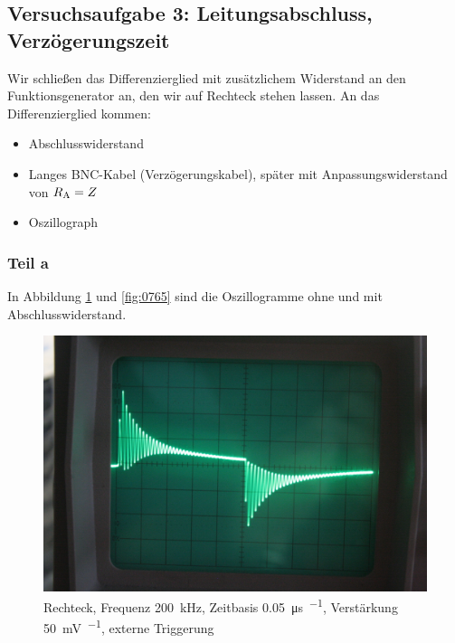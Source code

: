 \FloatBarrier
\subsection{Versuchsaufgabe 3: Leitungsabschluss, Verzögerungszeit}

Wir schließen das Differenzierglied mit zusätzlichem Widerstand an den
Funktionsgenerator an, den wir auf Rechteck stehen lassen. An das
Differenzierglied kommen:
%
\begin{itemize}
	\item
		Abschlusswiderstand
	\item
		Langes BNC-Kabel (Verzögerungskabel), später mit Anpassungswiderstand
		von $R_\text A = Z$
	\item
		Oszillograph
\end{itemize}

\FloatBarrier
\subsubsection{Teil a}

In Abbildung \ref{fig:0763} und \ref{fig:0765} sind die Oszillogramme ohne und
mit Abschlusswiderstand.

\begin{figure}
	\centering
	\begin{minipage}{.45\linewidth}
	\end{minipage}
	\hfill
	\begin{minipage}{.45\linewidth}
	\includegraphics[width=\linewidth]{Fotos/IMG_0763-1500.jpg}
	\end{minipage}
	\caption{%
		Rechteck, Frequenz \SI{200}{\kilo\hertz},
		Zeitbasis \SI{.05}{\micro\second\per\division},
		Verstärkung \SI{50}{\milli\volt\per\division},
		externe Triggerung
	}
	\label{fig:0763}
\end{figure}

